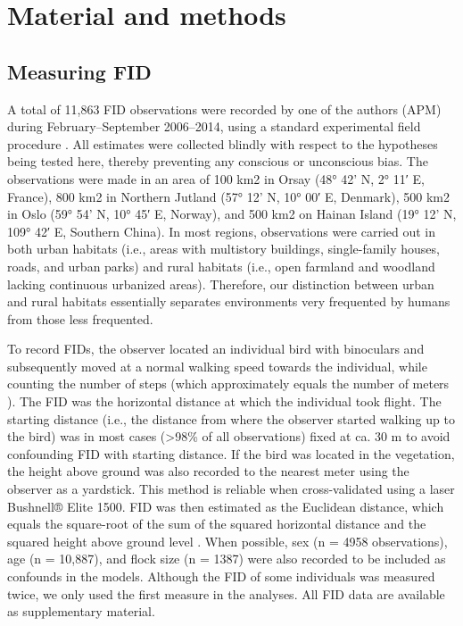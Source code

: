\section{Material and methods}

\subsection*{Measuring FID}

A total of 11,863 FID observations were recorded by one of
the authors (APM) during February–September 2006–2014,
using a standard experimental field procedure \citep{Hediger1934, hemmingsen1951relation, Blumstein2006}. 
All estimates were collected
blindly with respect to the hypotheses being tested here,
thereby preventing any conscious or unconscious bias. The
observations were made in an area of 100 km2 in Orsay (48°
42’ N, 2° 11′ E, France), 800 km2 in Northern Jutland (57° 12’
N, 10° 00′ E, Denmark), 500 km2 in Oslo (59° 54’ N, 10° 45′
E, Norway), and 500 km2 on Hainan Island (19° 12’ N, 109°
42′ E, Southern China). In most regions, observations were
carried out in both urban habitats (i.e., areas with multistory
buildings, single-family houses, roads, and urban parks) and
rural habitats (i.e., open farmland and woodland lacking continuous
urbanized areas). Therefore, our distinction between
urban and rural habitats essentially separates environments
very frequented by humans from those less frequented.

To record FIDs, the observer located an individual bird
with binoculars and subsequently moved at a normal walking
speed towards the individual, while counting the number of
steps (which approximately equals the number of meters
\citep{Moller2008}). The FID was the horizontal distance at which
the individual took flight. The starting distance (i.e., the distance
from where the observer started walking up to the bird)
was in most cases (\textgreater{98\%} of all observations) fixed at ca. 30 m
to avoid confounding FID with starting distance. If the bird
was located in the vegetation, the height above ground was
also recorded to the nearest meter using the observer as a
yardstick. This method is reliable when cross-validated using
a laser Bushnell® Elite 1500. FID was then estimated as the
Euclidean distance, which equals the square-root of the sum of
the squared horizontal distance and the squared height above
ground level \citep{Blumstein2006}. When possible, sex (n = 4958
observations), age (n = 10,887), and flock size (n = 1387)
were also recorded to be included as confounds in the models.
Although the FID of some individuals was measured twice,
we only used the first measure in the analyses. All FID data
are available as supplementary material.


